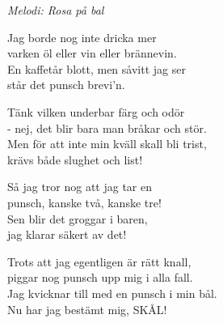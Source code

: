 {\footnotesize\textit{Melodi: Rosa på bal }}\par
\vspace{10pt}
Jag borde nog inte dricka mer\\
varken öl eller vin eller brännevin.\\
En kaffetår blott, men såvitt jag ser\\
står det punsch brevi'n.\par
\vspace{10pt}
Tänk vilken underbar färg och odör \\
 - nej, det blir bara man bråkar och stör.\\
Men för att inte min kväll skall bli trist,\\
krävs både slughet och list!\par
\vspace{10pt}
Så jag tror nog att jag tar en\\
punsch, kanske två, kanske tre!\\
Sen blir det groggar i baren,\\
jag klarar säkert av det!\par
\vspace{10pt}
Trots att jag egentligen är rätt knall,\\
piggar nog punsch upp mig i alla fall.\\
Jag kvicknar till med en punsch i min bål.\\
Nu har jag bestämt mig, SKÅL!
